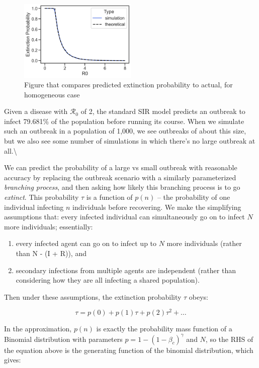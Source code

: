 \begin{figure}
\centering
\includegraphics[width=0.5\textwidth,height=\textheight]{images/R2_extinction.png}
\caption{Figure that compares predicted extinction probability to
actual, for homogeneous case}
\end{figure}

Given a disease with \(\mathcal{R}_0\) of 2, the standard SIR model
predicts an outbreak to infect 79.681\% of the population before running
its course. When we simulate such an outbreak in a population of 1,000,
we see outbreaks of about this size, but we also see some number of
simulations in which there's no large outbreak at all.\textbackslash{}

We can predict the probability of a large vs small outbreak with
reasonable accuracy by replacing the outbreak scenario with a similarly
parameterized \textit{branching process}, and then asking how likely
this branching process is to go \textit{extinct}. This probability
\(\tau\) is a function of \(p(n)\) -- the probability of one individual
infecting \(n\) individuals before recovering. We make the simplifying
assumptions that: every infected individual can simultaneously go on to
infect \(N\) more individuals; essentially:

\begin{enumerate}
\def\labelenumi{\arabic{enumi}.}
\tightlist
\item
  every infected agent can go on to infect up to \(N\) more individuals
  (rather than N - (I + R)), and
\item
  secondary infections from multiple agents are independent (rather than
  considering how they are all infecting a shared population).
\end{enumerate}

Then under these assumptions, the extinction probability \(\tau\) obeys:

\[\tau = p(0) + p(1)\tau + p(2)\tau^2 + \ldots\]

In the approximation, \(p(n)\) is exactly the probability mass function
of a Binomial distribution with parameters
\(p=1 - (1 - \beta_c)^\gamma\) and \(N\), so the RHS of the equation
above is the generating function of the binomial distribution, which
gives:

